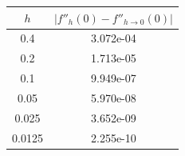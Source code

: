 \begin{tabular}{cc}
\toprule
$h$ & $|f''_h(0)-f''_{h\to0}(0)|$ \\
\midrule
0.4 & 3.072e-04 \\
0.2 & 1.713e-05 \\
0.1 & 9.949e-07 \\
0.05 & 5.970e-08 \\
0.025 & 3.652e-09 \\
0.0125 & 2.255e-10 \\
\bottomrule
\end{tabular}

